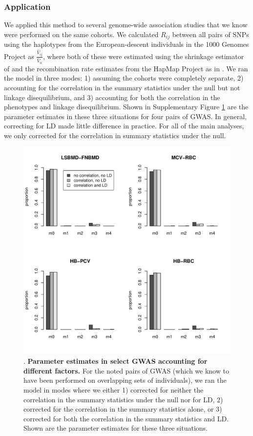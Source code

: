 \documentclass[11pt,titlepage]{article}
\begin{document}
\subsubsection{Application}
We applied this method to several genome-wide association studies that we know were performed on the same cohorts. We calculated $R_{ij}$ between all pairs of SNPs using the haplotypes from the European-descent individuals in the 1000 Genomes Project as $\frac{\hat V_{ij}}{\hat V_{ii}}$, where both of these were estimated using the shrinkage estimator of \citet{Wen:2010aa} and the recombination rate estimates from the HapMap Project as in \citet{berisa2015approximately}. We ran the model in three modes: 1) assuming the cohorts were completely separate, 2) accounting for the correlation in the summary statistics under the null but not linkage disequilibrium, and 3) accounting for both the correlation in the phenotypes and linkage disequilibrium. Shown in Supplementary Figure \ref{f_barplot} are the parameter estimates in these three situations for four pairs of GWAS. In general, correcting for LD made little difference in practice. For all of the main analyses, we only corrected for the correlation in summary statistics under the null.


\begin{figure}
\begin{center}
\includegraphics[scale = 0.6]{figs/barplot.pdf}
\caption{. \textbf{Parameter estimates in select GWAS accounting for different factors.} For the noted pairs of GWAS (which we know to have been performed on overlapping sets of individuals), we ran the model in modes where we either 1) corrected for neither the correlation in the summary statistics under the null nor for LD, 2) corrected for the correlation in the summary statistics alone, or 3) corrected for both the correlation in the summary statistics and LD. Shown are the parameter estimates for these three situations.}\label{f_barplot}
\end{center}
\end{figure}
\end{document}
